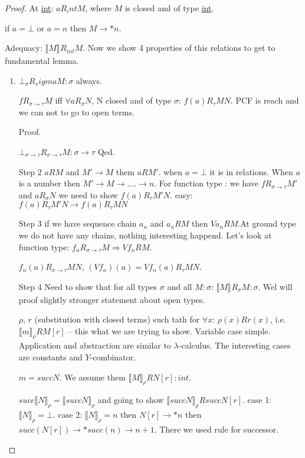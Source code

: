 \documentclass[a4paper,10pt]{book}
\newcommand{\sem}[2]{ \llbracket#1\rrbracket_{#2} }
\newcommand{\rarr}{ \rightarrow }
\begin{document}
\begin{proof}
 At \underline{int}: $a R_int M$, where $M$ is closed and of type \underline{int}.
 
 if $a = \bot$ or $a=n$ then $M \rarr *n$.
 
 Adequacy: $\sem{M}{}R_{int}M$. Now we show 4 properties of this relations to get to fundamental lemma.
 
 \begin{enumerate}
  \item $\bot_\sigma R_sigma M:\sigma$ always.
  
  $f R_{\sigma\rarr \tau}M$ iff $\forall a R_\sigma N$, N closed and of type $\sigma$:
  $f(a)R_\tau MN$. PCF is   reach and we can not to go to open terms.
  
  Proof.
  
  $\bot_{\sigma\rarr \tau} R_{\sigma\rarr \tau}  M : \sigma \rarr \tau$
  Qed.
  \item [Step 2]
  $aRM$  and $M'\rarr M$ them $aRM'$. when $a=\bot$ it is in relations. When $a$ is a number
  then $M'\rarr M\rarr .... \rarr n$. For function type : we have $fR_{\sigma\rarr \tau}M'$ and
  $aR_\sigma N$ we need to show $f(a) R_\tau M'N$. easy: $f(a)R_\tau M'N \rarr f(a)R_\tau MN $
  \item[Step 3] 
  if we have sequence chain $a_n$ and $a_nRM$ then $Va_n RM$.At ground type we do not have any 
  chains, nothing interesting happend. Let's look at function type: 
  $f_nR_{\sigma\rarr \tau}M \Rightarrow Vf_nRM$.
  
  $f_n(a)R_{\sigma\rarr \tau}MN$,  $(Vf_n)(a) = Vf_n(a) R_\tau MN$.
  
  \item [Step 4]
  Need to show that for all types $\sigma$ and all $M:\sigma$: $\sem{M}{}R_\sigma M:\sigma$.
  Wel will proof slightly stronger statement about open types.
  
  $\rho$, $r$ (substitution with closed terms) such tath for $\forall x$: $\rho(x)Rr(x)$, i.e.
  $\sem{m}{\rho}R M[r]$ -- this what we are trying to show. Variable case simple. Application and
  abstraction are similar to $\lambda$-calculus. The interesting cases are constants and $Y$-combinator.
  
  $m=succ N$. We assume them $\sem{M}{\rho}RN[r]: int$.
  
  $succ\sem{N}{\rho} = \sem{succ N}{\rho}$ and going to show $\sem{succ N}{\rho} R succ N[r]$.
  case 1: $\sem{N}{\rho}=\bot$. case 2: $\sem{N}{\rho} = n$ then $N[r] \rarr * n$ then 
  $succ(N[r]) \rarr* succ(n) \rarr n+1$. There we used rule for successor.
  

\end{enumerate}
\end{proof}
\end{document}
